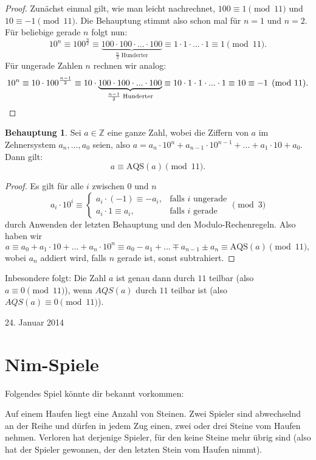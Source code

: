 \documentclass[a4paper,ngerman,12pt]{scrartcl}
\newcommand{\Z}{\mathbb{Z}}
\newcommand{\datum}[1]{\hfill {#1}\\}
\theoremstyle{definition}
\newtheorem{satz}{Behauptung}
\begin{document}
\begin{proof}
  Zunächst einmal gilt, wie man leicht nachrechnet, $100 \equiv 1 \pmod{11}$ und $10 \equiv -1 \pmod{11}$. Die Behauptung stimmt also schon mal für $n{=}1$ und $n{=}2$. Für beliebige gerade $n$ folgt nun:
  \[ 10^n \equiv 100^{\frac{n}{2}} \equiv \underbrace{100 \cdot 100 \cdot ... \cdot 100}_{\text{$\tfrac{n}{2}$ Hunderter}} \equiv 1 \cdot 1 \cdot ... \cdot 1 \equiv 1 \pmod{11}. \]
  Für ungerade Zahlen $n$ rechnen wir analog:
  \[ 10^n \equiv 10 \cdot 100^{\frac{n-1}{2}} \equiv 10 \cdot \underbrace{100 \cdot 100 \cdot ... \cdot 100}_{\text{$\tfrac{n-1}{2}$ Hunderter}} \equiv 10 \cdot 1 \cdot 1 \cdot ... \cdot 1 \equiv 10 \equiv -1 \pmod{11}.\qedhere \]
\end{proof}

\begin{satz}
  Sei $a \in \Z$ eine ganze Zahl, wobei die Ziffern von $a$ im Zehnersystem $a_n, ..., a_0$ seien, also $a = a_n \cdot 10^n + a_{n-1} \cdot 10^{n-1} + ... + a_1 \cdot 10 + a_0$. Dann gilt:
  \[ a \equiv \mathrm{AQS}(a) \pmod{11}. \]
\end{satz}

\begin{proof}
  Es gilt für alle $i$ zwischen $0$ und $n$
  \[ a_i \cdot 10^i \equiv \begin{cases} a_i \cdot (-1) \equiv -a_i, & \text{falls $i$ ungerade} \\ a_i \cdot 1 \equiv a_i, & \text{falls $i$ gerade} \end{cases} \pmod{3} \]
  durch Anwenden der letzten Behauptung und den Modulo-Rechenregeln. Also haben wir
  \[ a \equiv a_0 + a_1 \cdot 10 + ... + a_n \cdot 10^n \equiv a_0 - a_1 + ... \mp a_{n-1} \pm a_n \equiv \mathrm{AQS}(a) \pmod{11}, \]
  wobei $a_n$ addiert wird, falls $n$ gerade ist, sonst subtrahiert.
\end{proof}

Inbesondere folgt: Die Zahl $a$ ist genau dann durch $11$ teilbar (also $a \equiv 0 \pmod{11}$), wenn $AQS(a)$ durch $11$ teilbar ist (also $AQS(a) \equiv 0 \pmod{11}$).

\datum{24. Januar 2014}

\section{Nim-Spiele}

Folgendes Spiel könnte dir bekannt vorkommen:

Auf einem Haufen liegt eine Anzahl von Steinen. Zwei Spieler sind abwechselnd an der Reihe und dürfen in jedem Zug einen, zwei oder drei Steine vom Haufen nehmen. Verloren hat derjenige Spieler, für den keine Steine mehr übrig sind (also hat der Spieler gewonnen, der den letzten Stein vom Haufen nimmt).
\end{document}
